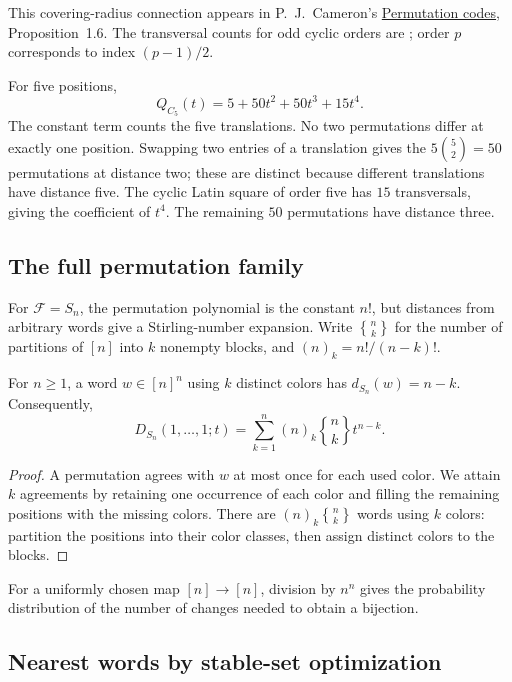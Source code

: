 This covering-radius connection appears in P.~J.~Cameron's
\href{https://doi.org/10.1016/j.ejc.2009.03.044}{Permutation codes},
Proposition~1.6. The transversal counts for odd cyclic orders are
; order $p$ corresponds
to index $(p-1)/2$.

\begin{example}
For five positions,
\[
 Q_{C_5}(t)=5+50t^2+50t^3+15t^4.
\]
The constant term counts the five translations. No two permutations
differ at exactly one position. Swapping two entries of a translation
gives the $5\binom52=50$ permutations at distance two; these are
distinct because different translations have distance five.
The cyclic Latin square of order five has $15$ transversals, giving
the coefficient of $t^4$. The remaining $50$ permutations have distance
three.
\end{example}

\subsection[fullPermutationDistance]{The full permutation family}

For $\mathcal F=S_n$, the permutation polynomial is the constant $n!$,
but distances from arbitrary words give a Stirling-number expansion.
Write ${n\brace k}$ for the number of partitions of $[n]$ into $k$
nonempty blocks, and $(n)_k=n!/(n-k)!$.

\begin{proposition}
For $n\ge1$, a word $w\in[n]^n$ using $k$ distinct colors has
$d_{S_n}(w)=n-k$. Consequently,
\[
 D_{S_n}(1,\dotsc,1;t)
 =\sum_{k=1}^n(n)_k{n\brace k}t^{n-k}.
\]
\end{proposition}

\begin{proof}
A permutation agrees with $w$ at most once for each used color.
We attain $k$ agreements by retaining one occurrence of each color
and filling the remaining positions with the missing colors.
There are $(n)_k{n\brace k}$ words using $k$ colors: partition the
positions into their color classes, then assign distinct colors to
the blocks.
\end{proof}

For a uniformly chosen map $[n]\to[n]$, division by $n^n$ gives the
probability distribution of the number of changes needed to obtain a
bijection.

\subsection[stableSetDecoding]{Nearest words by stable-set optimization}

